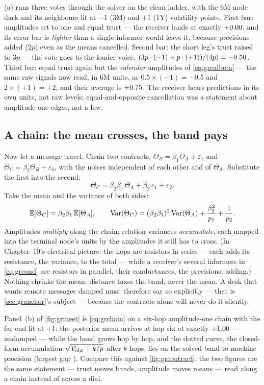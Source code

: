 (a) runs three votes through the solver on the clean
ladder, with the 6M node dark and its neighbours lit at $-1$ (3M) and
$+1$ (1Y) volatility points.  First bar: amplitudes set to one and
equal trust --- the receiver lands at exactly
$+0.00$, and its error bar is \emph{tighter} than a single
informer would leave it, because precisions added ($2p$) even as the
means cancelled.  Second bar: the short leg's trust raised to $3p$ ---
the vote goes to the louder voice,
$(3p\cdot(-1)+p\cdot(+1))/(4p)=-0.50$.  Third bar: equal
trust again but the \emph{calendar} amplitudes of
\cref{eq:grcalbeta} --- the same raw signals now read, in 6M units, as
$0.5\times(-1)=-0.5$ and $2\times(+1)=+2$, and their average is
$+0.75$.  The receiver hears predictions in its own units,
not raw levels; equal-and-opposite cancellation was a statement about
amplitude-one edges, not a law.

\subsection{A chain: the mean crosses, the band pays}

Now let a message travel.  Chain two contracts,
$\Theta_B=\beta_1\Theta_A+\varepsilon_1$ and
$\Theta_C=\beta_2\Theta_B+\varepsilon_2$, with the noises independent
of each other and of $\Theta_A$.  Substitute the first into the
second:
\[
\Theta_C=\beta_2\beta_1\,\Theta_A
+\beta_2\,\varepsilon_1+\varepsilon_2 .
\]
Take the mean and the variance of both sides:
\begin{equation}
\mathbb{E}[\Theta_C]=\beta_2\beta_1\,\mathbb{E}[\Theta_A],
\qquad
\operatorname{Var}(\Theta_C)
=(\beta_2\beta_1)^{2}\operatorname{Var}(\Theta_A)
+\frac{\beta_2^{2}}{p_1}+\frac{1}{p_2}.
\label{eq:grchain}
\end{equation}
Amplitudes \emph{multiply} along the chain; relation variances
\emph{accumulate}, each mapped into the terminal node's units by the
amplitudes it still has to cross.  (In Chapter~10's electrical
picture: the hops are resistors in series --- each adds its
resistance, the variance, to the total --- while a receiver's several
informers in \cref{eq:grcond} are resistors in parallel, their
conductances, the precisions, adding.)  Nothing shrinks the mean:
distance taxes the band, never the mean.  A desk that wants remote
messages damped must therefore say so explicitly --- that is
\cref{sec:granchor}'s subject --- because the contracts alone will
never do it silently.

Panel~(b) of \cref{fig:grmeet} is \cref{eq:grchain} on a six-hop
amplitude-one chain with the far end lit at $+1$: the posterior mean
arrives at hop six at exactly $+1.00$ --- undamped --- while
the band grows hop by hop, and the dotted curve, the closed-form
accumulation $\sqrt{\smash[b]{\mathcal{V}_{\mathrm{obs}}+k/p}}$ after
$k$ hops, lies on the solved band to machine precision (largest gap
\MacGrHopGap).  Compare this against \cref{fig:grcontract}: the two
figures are the same statement --- trust moves bands, amplitude moves
means --- read along a chain instead of across a dial.

